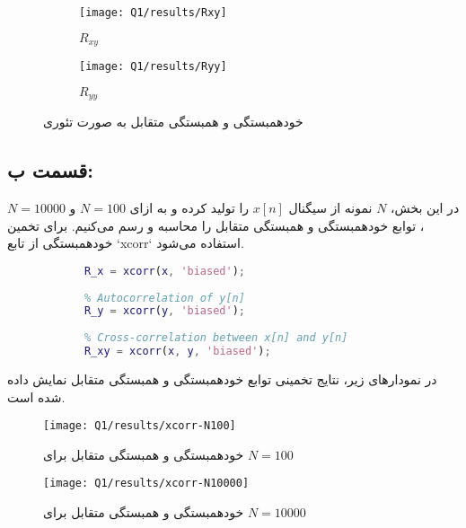 \documentclass[12pt,onecolumn,a4paper]{article}
\begin{document}
	\begin{figure}[H]
		\centering
		\begin{subfigure}{.45\linewidth}
			\centering
			\texttt{[image: Q1/results/Rxy]}
			\caption{$R_{xy}$}
			\label{fig:rxy}
		\end{subfigure}
		\hfill
		\begin{subfigure}{.45\linewidth}
			\centering
			\texttt{[image: Q1/results/Ryy]}
			\caption{$R_{yy}$}
			\label{fig:ryy}
		\end{subfigure}
		\caption{خودهمبستگی و همبستگی متقابل به صورت تئوری}
	\end{figure}
	
	\FloatBarrier
	\subsection{قسمت ب:}
	
	
	در این بخش، \( N \) نمونه از سیگنال \( x[n] \) را تولید کرده و به ازای \( N = 100 \) و \( N = 10000 \)، توابع خودهمبستگی و همبستگی متقابل را محاسبه و رسم می‌کنیم. برای تخمین خودهمبستگی از تابع `xcorr` استفاده می‌شود.
	
	\begin{latin}
		\begin{lstlisting}[language=Matlab]
			% Autocorrelation of x[n]
			R_x = xcorr(x, 'biased');
			
			% Autocorrelation of y[n]
			R_y = xcorr(y, 'biased');
			
			% Cross-correlation between x[n] and y[n]
			R_xy = xcorr(x, y, 'biased');
		\end{lstlisting}
	\end{latin}
	
	در نمودارهای زیر، نتایج تخمینی توابع خودهمبستگی و همبستگی متقابل نمایش داده شده است.
	
	\begin{figure}
		\centering
		\texttt{[image: Q1/results/xcorr-N100]}
		\caption{خودهمبستگی و همبستگی متقابل برای \( N = 100 \)}
		\label{fig:xcorr-n100}
	\end{figure}
	
	\begin{figure}
		\centering
		\texttt{[image: Q1/results/xcorr-N10000]}
		\caption{خودهمبستگی و همبستگی متقابل برای \( N = 10000 \)}
		\label{fig:xcorr-n10000}
	\end{figure}
	
\end{document}
